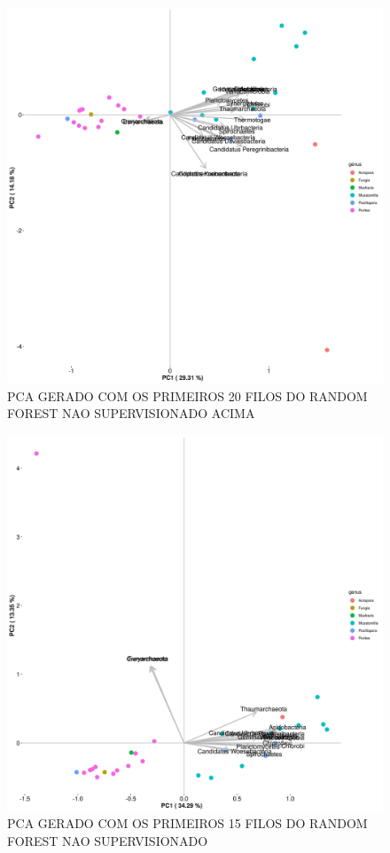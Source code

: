 \documentclass[12pt, a4paper]{report}
\begin{document}
\begin{figure}[H]
\centering
\includegraphics[scale=0.4]{figures/pca_corais_rf_nao_supervisionado_20_filos_23_10_2018.jpg}
\caption{PCA GERADO COM OS PRIMEIROS 20 FILOS DO RANDOM FOREST NAO SUPERVISIONADO ACIMA}
\end{figure}

\begin{figure}[H]
\centering
\includegraphics[scale=0.4]{figures/pca_corais_rf_nao_supervisionado_15_filos_23_10_2018.jpg}
\caption{PCA GERADO COM OS PRIMEIROS 15 FILOS DO RANDOM FOREST NAO SUPERVISIONADO}
\end{figure}
\end{document}
